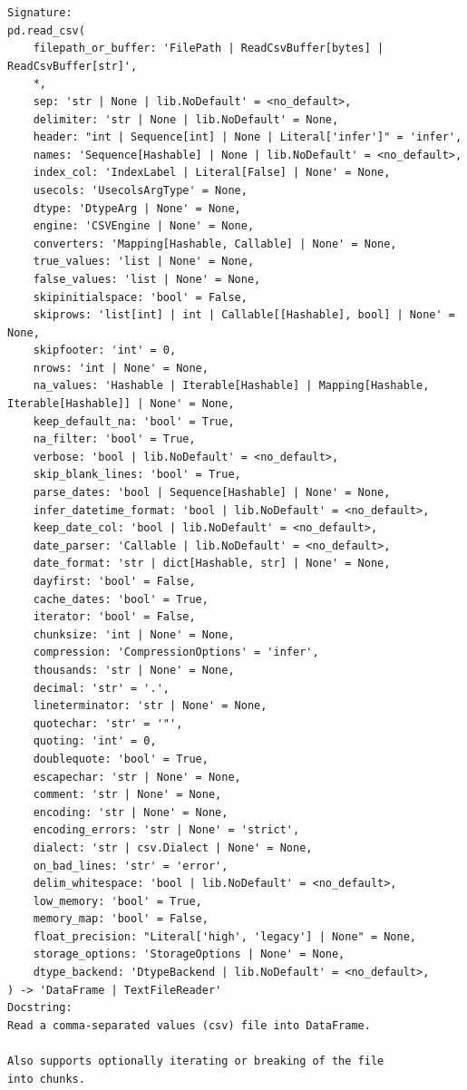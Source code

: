 \documentclass[
  letterpaper,
  DIV=11,
  numbers=noendperiod]{scrreprt}
\begin{document}
\begin{verbatim}
Signature:
pd.read_csv(
    filepath_or_buffer: 'FilePath | ReadCsvBuffer[bytes] | ReadCsvBuffer[str]',
    *,
    sep: 'str | None | lib.NoDefault' = <no_default>,
    delimiter: 'str | None | lib.NoDefault' = None,
    header: "int | Sequence[int] | None | Literal['infer']" = 'infer',
    names: 'Sequence[Hashable] | None | lib.NoDefault' = <no_default>,
    index_col: 'IndexLabel | Literal[False] | None' = None,
    usecols: 'UsecolsArgType' = None,
    dtype: 'DtypeArg | None' = None,
    engine: 'CSVEngine | None' = None,
    converters: 'Mapping[Hashable, Callable] | None' = None,
    true_values: 'list | None' = None,
    false_values: 'list | None' = None,
    skipinitialspace: 'bool' = False,
    skiprows: 'list[int] | int | Callable[[Hashable], bool] | None' = None,
    skipfooter: 'int' = 0,
    nrows: 'int | None' = None,
    na_values: 'Hashable | Iterable[Hashable] | Mapping[Hashable, Iterable[Hashable]] | None' = None,
    keep_default_na: 'bool' = True,
    na_filter: 'bool' = True,
    verbose: 'bool | lib.NoDefault' = <no_default>,
    skip_blank_lines: 'bool' = True,
    parse_dates: 'bool | Sequence[Hashable] | None' = None,
    infer_datetime_format: 'bool | lib.NoDefault' = <no_default>,
    keep_date_col: 'bool | lib.NoDefault' = <no_default>,
    date_parser: 'Callable | lib.NoDefault' = <no_default>,
    date_format: 'str | dict[Hashable, str] | None' = None,
    dayfirst: 'bool' = False,
    cache_dates: 'bool' = True,
    iterator: 'bool' = False,
    chunksize: 'int | None' = None,
    compression: 'CompressionOptions' = 'infer',
    thousands: 'str | None' = None,
    decimal: 'str' = '.',
    lineterminator: 'str | None' = None,
    quotechar: 'str' = '"',
    quoting: 'int' = 0,
    doublequote: 'bool' = True,
    escapechar: 'str | None' = None,
    comment: 'str | None' = None,
    encoding: 'str | None' = None,
    encoding_errors: 'str | None' = 'strict',
    dialect: 'str | csv.Dialect | None' = None,
    on_bad_lines: 'str' = 'error',
    delim_whitespace: 'bool | lib.NoDefault' = <no_default>,
    low_memory: 'bool' = True,
    memory_map: 'bool' = False,
    float_precision: "Literal['high', 'legacy'] | None" = None,
    storage_options: 'StorageOptions | None' = None,
    dtype_backend: 'DtypeBackend | lib.NoDefault' = <no_default>,
) -> 'DataFrame | TextFileReader'
Docstring:
Read a comma-separated values (csv) file into DataFrame.

Also supports optionally iterating or breaking of the file
into chunks.


\end{verbatim}
\end{document}
